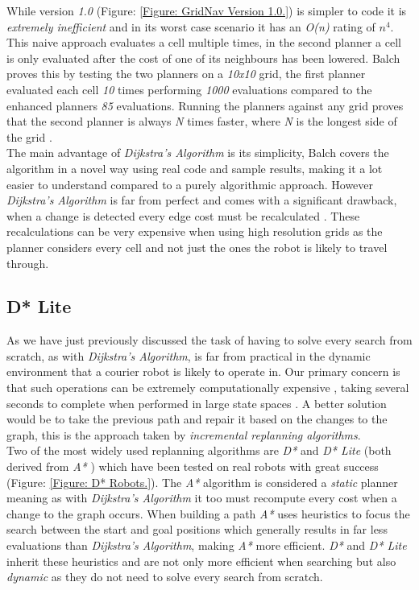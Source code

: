 \noindent
While version \textit{1.0} (Figure: \ref{Figure: GridNav Version 1.0.}) is simpler to code it is \textit{extremely inefficient} \cite{GRIDNAV95} and in its worst case scenario it has an \textit{O(n)} rating of \textit{$n^{4}$}. This naive approach evaluates a cell multiple times, in the second planner a cell is only evaluated after the cost of one of its neighbours has been lowered. Balch proves this by testing the two planners on a \textit{10x10} grid, the first planner evaluated each cell \textit{10} times performing \textit{1000} evaluations compared to the enhanced planners \textit{85} evaluations. Running the planners against any grid proves that the second planner is always \textit{N} times faster, where \textit{N} is the longest side of the grid \cite{GRIDNAV95}.\\ 

\noindent
The main advantage of \textit{Dijkstra's Algorithm} is its simplicity, Balch covers the algorithm in a novel way using real code and sample results, making it a lot easier to understand compared to a purely algorithmic approach. However \textit{Dijkstra's Algorithm} is far from perfect and comes with a significant drawback, when a change is detected every edge cost must be recalculated \cite{GRIDNAV95}. These recalculations can be very expensive  when using high resolution grids \cite{HEURISTIC} as the planner considers every cell and not just the ones the robot is likely to travel through. 

\newpage

\subsection{D* Lite}
\noindent
As we have just previously discussed the task of having to solve every search from scratch, as with \textit{Dijkstra's Algorithm}, is far from practical in the dynamic environment that a courier robot is likely to operate in. Our primary concern is that such operations can be extremely computationally expensive \cite{HEURISTIC}, taking several seconds to complete when performed in large state spaces \cite{D*LITE}. A better solution would be to take the previous path and repair it based on the changes to the graph, this is the approach taken by \textit{incremental replanning algorithms}.\\

\noindent
Two of the most widely used replanning algorithms are \textit{D*} \cite{D*} and \textit{D* Lite} \cite{D*LITE} (both derived from \textit{A*} \cite{A*}) which have been tested on real robots with great success (Figure: \ref{Figure: D* Robots.}). The \textit{A*} algorithm is considered a \textit{static} planner meaning as with \textit{Dijkstra's Algorithm} it too must recompute every cost when a change to the graph occurs. When building a path \textit{A*} uses heuristics to focus the search between the start and goal positions \cite{A*} which generally results in far less evaluations than \textit{Dijkstra's Algorithm}, making \textit{A*} more efficient. \textit{D*} and \textit{D* Lite} inherit these heuristics and are not only more efficient when searching but also \textit{dynamic} as they do not need to solve every search from scratch.\\

